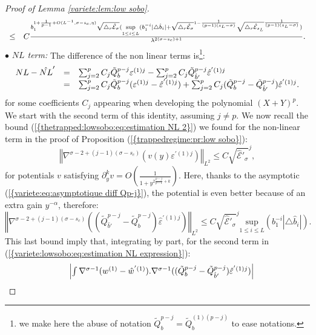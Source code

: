\documentclass[11pt,a4paper,reqno]{amsart}
\theoremstyle{remark}
\numberwithin{equation}{section}
\begin{document}
\begin{proof}[Proof of Lemma \ref{variete:lem:low sobo}]
\begin{equation}
\begin{array}{r c l}
\leq &   C\frac{b_1^{1+\frac{1}{p-1}+O(L^{-1},\sigma-s_c,\eta)}\sqrt{\triangle_r \hat{\mathcal{E}}_{\sigma}}(\underset{1\leq i \leq L}{\text{sup}}(b_1^{-i}|\triangle \hat{b}_i|+\sqrt{\triangle _r \hat{\mathcal{E}}_{\sigma}}^{1-\frac{1}{(p-1)(s_L-\sigma)}}\sqrt{\triangle _r \hat{\mathcal{E}}_{s_L}}^{\frac{1}{(p-1)(s_L-\sigma)}})}{\lambda^{2(\sigma-s_c)+1}} .
\end{array}
\end{equation}
$\bullet$ \emph{$NL$ term:} The difference of the non linear terms is\footnote{we make here the abuse of notation $\tilde{Q}_b^{p-j}=\tilde{Q}_b^{(1)(p-j)}$ to ease notations.}:
\begin{equation} \label{variete:lowsobo:eq:estimation NL expression}
\begin{array}{r c l}
NL-\hat{NL}'&=&\sum_{j=2}^{p}C_j\tilde{Q}_{b}^{p-j}\varepsilon^{(1)j}-\sum_{j=2}^{p}C_j\tilde{Q}_{\hat{b}'}^{p-j}\hat{\varepsilon}^{'(1)j} \\
&=& \sum_{j=2}^{p}C_j\tilde{Q}_{b}^{p-j}(\varepsilon^{(1)j}-\hat{\varepsilon}^{'(1)j})+\sum_{j=2}^{p}C_j(\tilde{Q}_{b}^{p-j}-\tilde{Q}_{\hat{b}'}^{p-j})\hat{\varepsilon}^{'(1)j}.
\end{array}
\end{equation}
for some coefficients $C_j$ appearing when developing the polynomial $(X+Y)^p$. We start with the second term of this identity, assuming $j\neq p$. We now recall the bound {{\rm (\ref{{thetrapped:lowsobo:eq:estimation NL 2}})}} we found for the non-linear term in the proof of Proposition {{\rm (\ref{{trappedregime:pr:low sobo}})}}:
$$
\left\Vert \nabla^{\sigma-2+(j-1)(\sigma-s_c)}(v(y)\varepsilon^{'(1)j}) \right\Vert_{L^2} \leq C \sqrt{\hat{\mathcal{E}}'_{\sigma}}^j,
$$
for potentials $v$ satisfying $\partial_y^k v=O\left(\frac{1}{1+y^{2\frac{p-j}{p-1}+k}}  \right)$. Here, thanks to the asymptotic {{\rm (\ref{{variete:eq:asymptotique diff Qp-j}})}}, the potential is even better because of an extra gain $y^{-\alpha}$, therefore:
$$
\left\Vert \nabla^{\sigma-2+(j-1)(\sigma-s_c)}((\tilde{Q}_{\hat{b}'}^{p-j}-\tilde{Q}_b^{p-j})\hat{\varepsilon}^{'(1)j}) \right\Vert_{L^2} \leq  C\sqrt{\hat{\mathcal{E}}'_{\sigma}}^j \underset{1\leq i \leq L}{\text{sup}}(b_1^{-i}|\triangle \hat{b}_i|).
$$
This last bound imply that, integrating by part, for the second term in  {{\rm (\ref{{variete:lowsobo:eq:estimation NL expression}})}}:
\begin{equation} \label{variete:lowsobo:eq:estimation NL 1}
\begin{array}{r c l}
&\left| \int \nabla^{\sigma-1}(w^{(1)}-\hat{w}^{'(1)}).\nabla^{\sigma-1}((\tilde{Q}_{b}^{p-j}-\tilde{Q}_{\hat{b}'}^{p-j})\hat{\varepsilon}^{'(1)j} ) \right| \\

\end{array}
\end{equation}
\end{proof}
\end{document}
